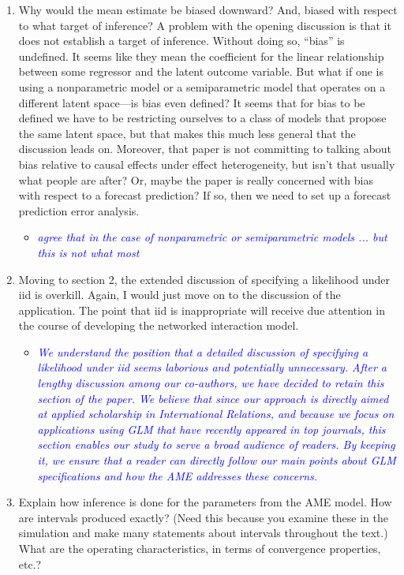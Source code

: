 \begin{enumerate}
	\item Why would the mean estimate be biased downward?  And, biased with respect to what target of inference?  A problem with the opening discussion is that it does not establish a target of inference.  Without doing so, ``bias'' is undefined.  It seems like they mean the coefficient for the linear relationship between some regressor and the latent outcome variable. But what if one is using a nonparametric model or a semiparametric model that operates on a different latent space---is bias even defined?  It seems that for bias to be defined we have to be restricting ourselves to a class of models that propose the same latent space, but that makes this much less general that the discussion leads on.  Moreover, that paper is not committing to talking about bias relative to causal effects under effect heterogeneity, but isn't that usually what people are after?  Or, maybe the paper is really concerned with bias with respect to a forecast prediction? If so, then we need to set up a forecast prediction error analysis.
	\begin{itemize}
		\item  \emph{ \textcolor{blue}{
		agree that in the case of nonparametric or semiparametric models ... but this is not what most
		}}
	\end{itemize}
	\item Moving to section 2, the extended discussion of specifying a likelihood under iid is overkill.  Again, I would just move on to the discussion of the application. The point that iid is inappropriate will receive due attention in the course of developing the networked interaction model.
	\begin{itemize}
		\item  \emph{ \textcolor{blue}{
		We understand the position that a detailed discussion of specifying a likelihood under iid seems laborious and potentially unnecessary. After a lengthy discussion among our co-authors, we have decided to retain this section of the paper. We believe that since our approach is directly aimed at applied scholarship in International Relations, and because we focus on applications using GLM that have recently appeared in top journals, this section enables our study to serve a broad audience of readers. By keeping it, we ensure that a reader can directly follow our main points about GLM specifications and how the AME addresses these concerns. 
		}}
	\end{itemize}
	\item Explain how inference is done for the parameters from the AME model. How are intervals produced exactly? (Need this because you examine these in the simulation and make many statements about intervals throughout the text.)  What are the operating characteristics, in terms of convergence properties, etc.?

\end{enumerate}

